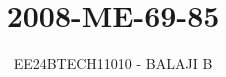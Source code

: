 \documentclass[journal]{IEEEtran}
\begin{document}

\vspace{3cm}

\title{2008-ME-69-85}
\author{EE24BTECH11010 - BALAJI B}
{\let\newpage\relax\maketitle}

\renewcommand{\thefigure}{\theenumi}
\renewcommand{\thetable}{\theenumi}
\setlength{\intextsep}{10pt} %


\renewcommand{\thetable}{\theenumi}
\end{document}

